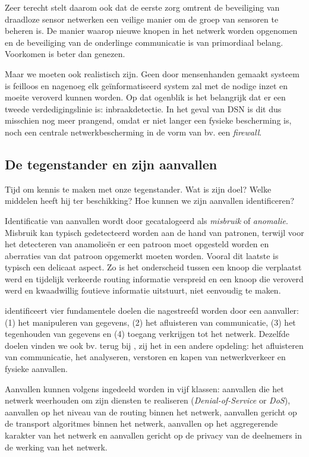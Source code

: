Zeer terecht stelt \citep{perrig2004security} daarom ook dat de eerste zorg
omtrent de beveiliging van draadloze sensor netwerken een veilige manier om de
groep van sensoren te beheren is. De manier waarop nieuwe knopen in het netwerk
worden opgenomen en de beveiliging van de onderlinge communicatie is van
primordiaal belang. Voorkomen is beter dan genezen.

Maar we moeten ook realistisch zijn. Geen door mensenhanden gemaakt systeem is
feilloos en nagenoeg elk ge\"informatiseerd system zal met de nodige inzet en
moeite veroverd kunnen worden. Op dat ogenblik is het belangrijk dat er een
tweede verdedigingslinie is: inbraakdetectie. In het geval van DSN is dit dus
misschien nog meer prangend, omdat er niet langer een fysieke bescherming is,
noch een centrale netwerkbescherming in de vorm van bv. een \emph{firewall}.

\subsection{De tegenstander en zijn aanvallen}

Tijd om kennis te maken met onze tegenstander. Wat is zijn doel? Welke middelen
heeft hij ter beschikking? Hoe kunnen we zijn aanvallen identificeren?

Identificatie van aanvallen wordt door \citep{zhang2000intrusion} gecatalogeerd
als \emph{misbruik} of \emph{anomalie}. Misbruik kan typisch gedetecteerd
worden aan de hand van patronen, terwijl voor het detecteren van anamolie\"en
er een patroon moet opgesteld worden en aberraties van dat patroon opgemerkt
moeten worden. Vooral dit laatste is typisch een delicaat aspect. Zo is het
onderscheid tussen een knoop die verplaatst werd en tijdelijk verkeerde routing
informatie verspreid en een knoop die veroverd werd en kwaadwillig foutieve
informatie uitstuurt, niet eenvoudig te maken.

\citep{aschenbruck2012security} identificeert vier fundamentele doelen die
nagestreefd worden door een aanvaller: (1) het manipuleren van gegevens, (2)
het afluisteren van communicatie, (3) het tegenhouden van gegevens en (4)
toegang verkrijgen tot het netwerk. Dezelfde doelen vinden we ook bv. terug bij
\citep{blilat2012wireless}, zij het in een andere opdeling: het afluisteren van
communicatie, het analyseren, verstoren en kapen van netwerkverkeer en fysieke
aanvallen.

Aanvallen kunnen volgens \citep{dargie2010fundamentals} ingedeeld worden in vijf
klassen: aanvallen die het netwerk weerhouden om zijn diensten te realiseren
(\emph{Denial-of-Service} or \emph{DoS}), aanvallen op het niveau van de
routing binnen het netwerk, aanvallen gericht op de transport algoritmes binnen
het netwerk, aanvallen op het aggregerende karakter van het netwerk en
aanvallen gericht op de privacy van de deelnemers in de werking van het netwerk.

